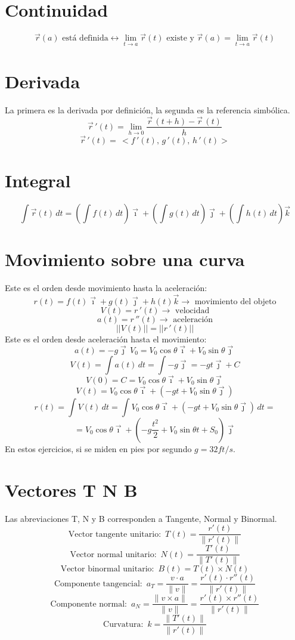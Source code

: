 \documentclass[letterpaper, 12pt]{article}
\begin{document}
        \section{Continuidad}
        \[\vec{r}(a) \text{ está definida}\leftrightarrow\lim_{t\rightarrow a}\vec{r}(t)\text{ existe y }\vec{r}(a)=\lim_{t\rightarrow a}\vec{r}(t)\]
        \section{Derivada}
        La primera es la derivada por definición, la segunda es la referencia simbólica.
        \[\vec{r}\,'(t)=\lim_{h\rightarrow 0}\frac{\vec{r}\, (t+h)-\vec{r}\, (t)}{h}\]
        \[\vec{r}\,'(t)=\,<\!f\,'(t),\, g\,'(t),\, h\,'(t)\!>\]
        \section{Integral}
        \[\int \vec{r}(t)\, dt=\left(\int f(t)\, dt\right)\vec{\imath}+\left(\int g(t)\, dt\right)\vec{\jmath} + \left(\int h(t)\, dt\right)\vec{k}\]
        \section{Movimiento sobre una curva}
        Este es el orden desde movimiento hasta la aceleración:
        \[r(t)=f(t)\vec{\imath}+g(t)\vec{\jmath}+h(t)\vec{k}\rightarrow\text{ movimiento del objeto}\]
        \[V(t)=r\,'\!(t)\rightarrow\text{ velocidad}\]
        \[a(t)=r\,''\!(t)\rightarrow\text{ aceleración}\]
        \[\lvert |V(t)|\rvert=\lvert |r\,'\!(t)|\rvert\]
        Este es el orden desde aceleración hasta el movimiento:
        \[a(t)=-g\vec{\jmath}\, V_0=V_0\cos \theta \vec{\imath}+V_0\sin \theta \vec{\jmath}\]
        \[V(t)=\int a(t)\, dt=\int -g\vec{\jmath}=-gt\vec{\jmath}+C\]
        \[V(0)=C=V_0\cos \theta \vec{\imath}+V_0\sin \theta \vec{\jmath}\]
        \[V(t)=V_0\cos \theta \vec{\imath}+\left(-gt+V_0\sin \theta \vec{\jmath}\right)\]
        \[r(t)=\int V(t)\, dt=\int V_0\cos \theta \vec{\imath}+\left(-gt+V_0\sin \theta \vec{\jmath}\right)\, dt=\]
        \[=V_0\cos \theta \vec{\imath}+\left(-g\frac{t^2}{2}+V_0\sin \theta t+S_0\right)\vec{\jmath}\]
        En estos ejercicios, si se miden en pies por segundo \(g=32 ft/s\).
        \section{Vectores T N B}
        Las abreviaciones T, N y B corresponden a Tangente, Normal y Binormal.
        \[\text{Vector tangente unitario: }\, T(t)=\frac{r'(t)}{\lVert r'(t)\rVert}\]
        \[\text{Vector normal unitario: }\, N(t)=\frac{T'(t)}{\lVert T'(t)\rVert}\]
        \[\text{Vector binormal unitario: }\, B(t)=T(t)\times N(t)\]
        \[\text{Componente tangencial: }\, a_T=\frac{v\cdot a}{\lVert v\rVert}=\frac{r'(t)\cdot r''(t)}{\lVert r'(t)\rVert}\]
        \[\text{Componente normal: }\, a_N=\frac{\lVert v\times a\rVert}{\lVert v\rVert}=\frac{r'(t)\times r''(t)}{\lVert r'(t)\rVert}\]
        \[\text{Curvatura: }\, k=\frac{\lVert T'(t)\rVert}{\lVert r'(t)\rVert}\]
\end{document}
